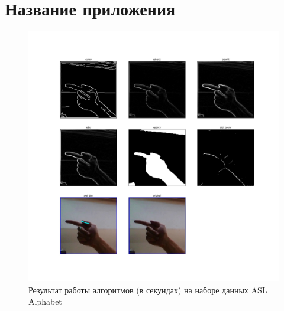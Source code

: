 \section{Название приложения}
\label{sec:Appendix_}

\begin{figure}[!h]
	\centering
	\includegraphics[width=\textwidth,keepaspectratio]{figures/ru/asl.jpg}
	\caption{Результат работы алгоритмов (в секундах) на наборе данных ASL Alphabet}
	\label{fig:asl}
\end{figure}

